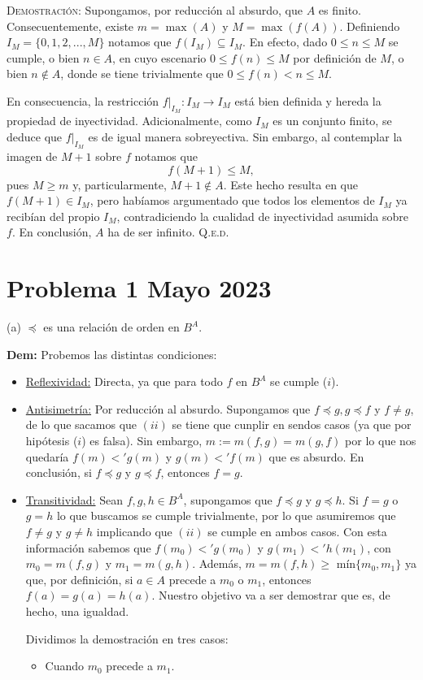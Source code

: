 \documentclass{article}
\begin{document}
\noindent \textsc{Demostración}: Supongamos, por reducción al absurdo, que $A$ es finito. Consecuentemente, existe $m = \max(A)$ y $M = \max(f(A))$. Definiendo $I_M = \{0, 1, 2, ..., M\}$ notamos que $f(I_M) \subseteq I_M$. En efecto, dado $0 \leq n \leq M$ se cumple, o bien $n \in A$, en cuyo escenario $0 \leq f(n) \leq M$ por definición de $M$, o bien $n \notin A$, donde se tiene trivialmente que $0 \leq f(n) < n \leq M$.

En consecuencia, la restricción $f\vert_{I_M} : I_M \longrightarrow I_M$ está bien definida y hereda la propiedad de inyectividad. Adicionalmente, como $I_M$ es un conjunto finito, se deduce que $f\vert_{I_M}$ es de igual manera sobreyectiva. Sin embargo, al contemplar la imagen de $M + 1$ sobre $f$ notamos que \[f(M + 1) \leq M,\] pues $M \geq m$ y, particularmente, $M + 1 \notin A$. Este hecho resulta en que $f(M + 1) \in I_M$, pero habíamos argumentado que todos los elementos de $I_M$ ya recibían del propio $I_M$, contradiciendo la cualidad de inyectividad asumida sobre $f$. En conclusión, $A$ ha de ser infinito. \hfill{\textsc{Q.e.d.}}

\newpage

\section{Problema 1 Mayo 2023}

(a) $\preceq$ es una relación de orden en $B^{A}.$

\noindent \textbf{Dem:} Probemos las distintas condiciones:

\begin{itemize}
    \item \underline{Reflexividad:} Directa, ya que para todo $f$ en $B^{A}$ se cumple ($i$).

    \item \underline{Antisimetría:} Por reducción al absurdo. Supongamos que $f \preceq g, g \preceq f$ y $f \neq g$, de lo que sacamos que $(ii)$ se tiene que cunplir en sendos casos (ya que por hipótesis ($i$) es falsa). Sin embargo, $m := m(f, g) = m(g, f)$ por lo que nos quedaría $f(m) <' g(m)$ y $g(m) <' f(m)$ que es absurdo. En conclusión, si $f \preceq g$ y $g \preceq f$, entonces $f = g$.

    \item \underline{Transitividad:} Sean $f, g, h \in B^{A}$, supongamos que $f \preceq g$ y $g \preceq h$. Si $f = g$ o $g = h$ lo que buscamos se cumple trivialmente, por lo que asumiremos que $f \neq g$ y $g \neq h$ implicando que $(ii)$ se cumple en ambos casos. Con esta información sabemos que $f(m_0) <' g(m_0)$ y $g(m_1) <' h(m_1)$, con $m_0 = m(f, g)$ y $m_1 = m(g, h)$. Además, $m = m(f, h) \geq$ mín$\{m_0, m_1\}$ ya que, por definición, si $a \in A$ precede a $m_0$ o $m_1$, entonces $f(a) = g(a) = h(a)$. Nuestro objetivo va a ser demostrar que es, de hecho, una igualdad.

    Dividimos la demostración en tres casos:

    \begin{itemize}
        \item Cuando $m_0$ precede a $m_1$.
    \end{itemize}
\end{itemize}
\end{document}
